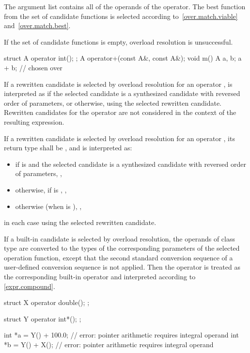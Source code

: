 \pnum
The argument list contains all of the
operands of the operator.
The best function from the set of candidate functions is selected
according to~\ref{over.match.viable}
and~\ref{over.match.best}.
\begin{footnote}
If the set of candidate functions is empty,
overload resolution is unsuccessful.
\end{footnote}
\begin{example}
\begin{codeblock}
struct A {
  operator int();
};
A operator+(const A&, const A&);
void m() {
  A a, b;
  a + b;                        //  chosen over 
}
\end{codeblock}
\end{example}

\pnum
If a rewritten  candidate
is selected by overload resolution
for an operator ,
is interpreted as
if the selected candidate is a synthesized candidate
with reversed order of parameters,
or  otherwise,
using the selected rewritten  candidate.
Rewritten candidates for the operator 
are not considered in the context of the resulting expression.

\pnum
If a rewritten  candidate
is selected by overload resolution
for an operator ,
its return type shall be \cv{} , and
 is interpreted as:
\begin{itemize}
\item
if  is \tcode{!=}
and the selected candidate is a synthesized candidate
with reversed order of parameters,
,
\item
otherwise, if  is \tcode{!=},
,
\item
otherwise (when  is \tcode{==}),
,
\end{itemize}
in each case using the selected rewritten  candidate.

\pnum
If a built-in candidate is selected by overload resolution, the
operands of class type are converted to the types of the corresponding parameters
of the selected operation function, except that the second standard conversion
sequence of a user-defined conversion sequence is not applied.
Then the operator is treated as the corresponding
built-in operator and interpreted according to \ref{expr.compound}.
\begin{example}
\begin{codeblock}
struct X {
  operator double();
};

struct Y {
  operator int*();
};

int *a = Y() + 100.0;           // error: pointer arithmetic requires integral operand
int *b = Y() + X();             // error: pointer arithmetic requires integral operand
\end{codeblock}
\end{example}

